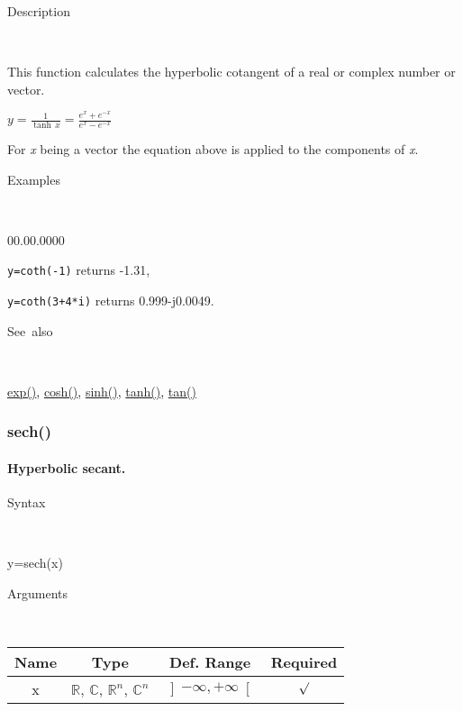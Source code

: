 \begin{description}
\item [Description]~
\end{description}
This function calculates the hyperbolic cotangent of a real or complex
number or vector.

\medskip{}
$y={\displaystyle \frac{1}{\tanh\, x}=\frac{e^{x}+e^{-x}}{e^{x}-e^{-x}}}$ 
\medskip{}

For \textit{x} being a vector the equation above is applied
to the components of \textit{x}.

\begin{description}
\item [Examples]~
\end{description}
\begin{lyxlist}{00.00.0000}
\item [\texttt{y=coth(-1)}]returns -1.31,
\item [\texttt{y=coth(3+4{*}i)}]returns 0.999-j0.0049.
\end{lyxlist}
\begin{description}
\item [See~also]~
\end{description}
\textcolor{blue}{\hyperlink{exp}{exp()}}\textcolor{black}{,} \textcolor{blue}{\hyperlink{cosh}{cosh()}}\textcolor{black}{,}
\textcolor{blue}{\hyperlink{sinh}{sinh()}}\textcolor{black}{,} \textcolor{blue}{\hyperlink{tanh}{tanh()}}\textcolor{black}{,}
\textcolor{blue}{\hyperlink{tan}{tan()}}


\newpage
\subsubsection*{\hypertarget{sech}{}{\Large sech()}}


\paragraph{\label{par:Hyperbolic-secant}Hyperbolic secant.}

\begin{description}
\item [Syntax]~
\end{description}
y=sech(x)

\begin{description}
\item [Arguments]~
\end{description}
\begin{tabular}{|c|c|c|c|}
\hline 
Name&
Type&
Def. Range&
Required\tabularnewline
\hline
\hline 
x&
$\mathbb{R}$, $\mathbb{C}$, $\mathbb{R}^{n}$, $\mathbb{C}^{n}$&
$\left]-\infty,+\infty\right[$&
$\surd$\tabularnewline
\hline
\end{tabular}

